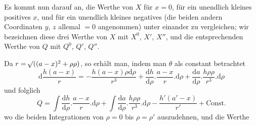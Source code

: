Es kommt nun darauf an, die Werthe von $X$ für $x=0$, für ein unendlich kleines positives $x$, und für ein unendlich kleines negatives (die beiden andern Coordinaten $y$, $z$ allemal $=0$ angenommen) unter einander zu vergleichen; wir bezeichnen diese drei Werthe von $X$ mit $X^0$, $X'$, $X''$, und die entsprechenden Werthe von $Q$ mit $Q^0$, $Q'$, $Q''$.

Da $r=\mathord{{}^{}\!\surd}((a-x)^2+\rho\rho)$, so erhält man, indem man $\theta$ als constant betrachtet
\[
\mathrm{d}\frac{h(a-x)}{r}=-\frac{h(a-x)\rho\mathrm{d}\rho}{r^3}+\frac{\mathrm{d}h}{\mathrm{d}\rho}.\frac{a-x}{r}.\mathrm{d}\rho+\frac{\mathrm{d}a}{\mathrm{d}\rho}.\frac{h\rho\rho}{r^3}.\mathrm{d}\rho
\]
und folglich
\[
Q=\int\frac{\mathrm{d}h}{\mathrm{d}\rho}.\frac{a-x}{r}.\mathrm{d}\rho+\int\frac{\mathrm{d}a}{\mathrm{d}\rho}.\frac{h\rho\rho}{r^3}.\mathrm{d}\rho-\frac{h'(a'-x)}{r'}+\text{Const.}
\]
wo die beiden Integrationen von $\rho=0$ bis $\rho=\rho'$ auszudehnen, und die Werthe
